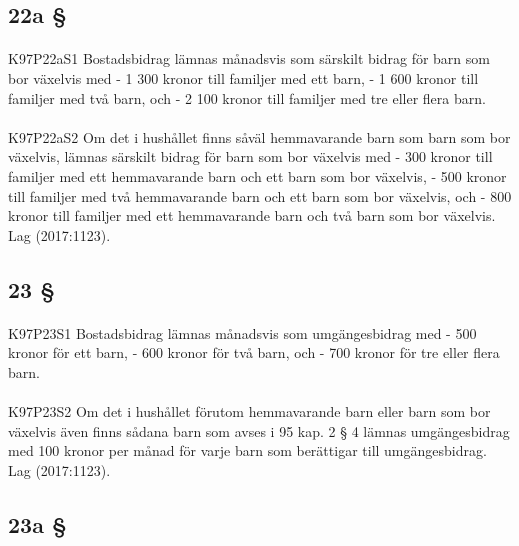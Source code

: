 \documentclass[a4paper,notitlepage,openany,10pt]{book}
\begin{document}
\subsection*{22a §}
\paragraph*{}
{\tiny K97P22aS1}
Bostadsbidrag lämnas månadsvis som särskilt bidrag för barn som bor växelvis med
\newline - 1 300 kronor till familjer med ett barn,
\newline - 1 600 kronor till familjer med två barn, och
\newline - 2 100 kronor till familjer med tre eller flera barn.
\paragraph*{}
{\tiny K97P22aS2}
Om det i hushållet finns såväl hemmavarande barn som barn som bor växelvis, lämnas särskilt bidrag för barn som bor växelvis med
\newline - 300 kronor till familjer med ett hemmavarande barn och ett barn som bor växelvis,
\newline - 500 kronor till familjer med två hemmavarande barn och ett barn som bor växelvis, och
\newline - 800 kronor till familjer med ett hemmavarande barn och två barn som bor växelvis.
Lag (2017:1123).
\subsection*{23 §}
\paragraph*{}
{\tiny K97P23S1}
Bostadsbidrag lämnas månadsvis som umgängesbidrag med
\newline - 500 kronor för ett barn,
\newline - 600 kronor för två barn, och
\newline - 700 kronor för tre eller flera barn.
\paragraph*{}
{\tiny K97P23S2}
Om det i hushållet förutom hemmavarande barn eller barn som bor växelvis även finns sådana barn som avses i 95 kap. 2 § 4 lämnas umgängesbidrag med 100 kronor per månad för varje barn som berättigar till umgängesbidrag.
Lag (2017:1123).
\subsection*{23a §}
\end{document}
